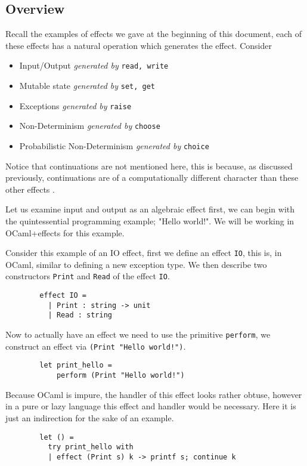 \subsection{Overview}
\begin{example}
    Recall the examples of effects we gave at the beginning of this document,
    each of these effects has a natural operation which generates the effect.
    Consider
    \begin{itemize}
        \item Input/Output \textit{generated by} \texttt{read, write}
        \item Mutable state \textit{generated by} \texttt{set, get}
        \item Exceptions \textit{generated by} \texttt{raise}
        \item Non-Determinism \textit{generated by} \texttt{choose}
        \item Probabilistic Non-Determinism \textit{generated by} \texttt{choice}
    \end{itemize}
\end{example}

Notice that continuations are not mentioned here,
this is because, as discussed previously,
continuations are of a computationally different character
than these other effects
\cite{Plotkin:2002dw}\cite{hyland2007combining}.

Let us examine input and output as an algebraic effect first,
we can begin with the quintessential programming example;
"Hello world!".
We will be working in OCaml+effects for this example.\\

\begin{example}
    Consider this example of an IO effect,
    first we define an effect \texttt{IO},
    this is, in OCaml, similar to defining
    a new exception type.
    We then describe two constructors
    \texttt{Print} and \texttt{Read}
    of the effect \texttt{IO}.

    \begin{verbatim}
        effect IO =
          | Print : string -> unit
          | Read : string
    \end{verbatim}

    Now to actually have an effect we need to use the primitive \texttt{perform},
    we construct an effect via \texttt{(Print "Hello world!")}.

    \begin{verbatim}
        let print_hello =
            perform (Print "Hello world!")
    \end{verbatim}

    Because OCaml is impure, the handler of this effect looks rather obtuse,
    however in a pure or lazy language this effect and handler would be necessary.
    Here it is just an indirection for the sake of an example.

    \begin{verbatim}
        let () =
          try print_hello with
          | effect (Print s) k -> printf s; continue k
    \end{verbatim}
\end{example}

